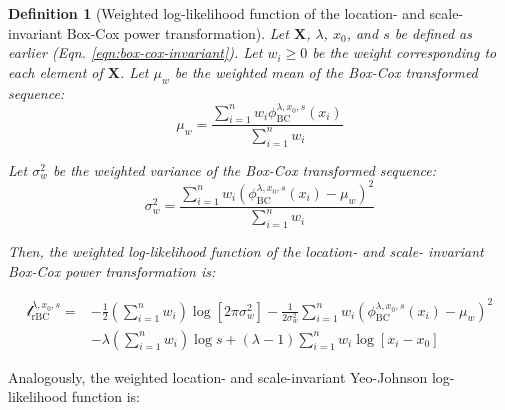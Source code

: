 \documentclass[
  a4paper,
]{article}
\newtheorem*{definition}{Definition}
\begin{document}
\begin{definition}[Weighted log-likelihood function of the location- and scale- invariant Box-Cox power transformation]
Let $\mathbf{X}$, $\lambda$, $x_0$, and $s$ be defined as earlier (Eqn. \ref{eqn:box-cox-invariant}).
Let $w_i \geq 0$ be the weight corresponding to each element of $\mathbf{X}$.
Let $\mu_w$ be the weighted mean of the Box-Cox transformed sequence:
\begin{equation*}
\mu_w = \frac{\sum_{i=1}^n w_i \phi_{\text{BC}}^{\lambda, x_0, s} (x_i)} {\sum_{i=1}^n w_i}
\end{equation*}

Let $\sigma^2_w$ be the weighted variance of the Box-Cox transformed sequence:
\begin{equation*}
\sigma_w^2 = \frac{\sum_{i=1}^n w_i \left(\phi_{\text{BC}}^{\lambda, x_0, s} (x_i) - \mu_w \right)^2}{\sum_{i=1}^n w_i}
\end{equation*}

Then, the weighted log-likelihood function of the location- and scale- invariant Box-Cox power transformation is:

\begin{equation}
\label{eqn:box-cox-weighted-invariant-log-likelihood}
\begin{split}
\mathcal{l}_{\text{rBC}}^{\lambda, x_0, s} = & -\frac{1}{2} \left(\sum_{i=1}^n w_i \right) \log \left[ 2 \pi \sigma_w^2 \right] -\frac{1}{2 \sigma_w^2} \sum_{i=1}^n w_i \left( \phi_{\text{BC}}^{\lambda, x_0, s}(x_i) - \mu_w \right)^2 \\
& - \lambda \left( \sum_{i=1}^n w_i \right) \log s + \left( \lambda - 1 \right) \sum_{i=1}^n w_i \log \left[ x_i - x_0 \right]
\end{split}
\end{equation}
\end{definition}

Analogously, the weighted location- and scale-invariant Yeo-Johnson
log-likelihood function is:
\end{document}
